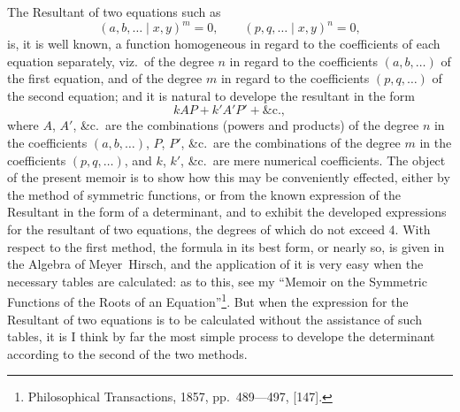 \documentclass[11pt,a4paper]{article}
\begin{document}
\normalsize

The Resultant of two equations such as
\[
(a, b, \ldots \mid x, y)^m = 0,
\qquad
(p, q, \ldots \mid x, y)^n = 0,
\]
is, it is well known, a function homogeneous in regard to the coefficients of
each equation separately, viz.\ of the degree $n$ in regard to the
coefficients $(a, b, \ldots)$ of the first equation, and of the degree $m$
in regard to the coefficients $(p, q, \ldots)$ of the second equation; and it
is natural to develope the resultant in the form
\[
kAP + k'A'P' + \&\text{c.},
\]
where $A$, $A'$, \&c.\ are the combinations (powers and products) of the
degree $n$ in the coefficients $(a, b, \ldots)$, $P$, $P'$, \&c.\ are the
combinations of the degree $m$ in the coefficients $(p, q, \ldots)$, and $k$,
$k'$, \&c.\ are mere numerical coefficients. The object of the present memoir
is to show how this may be conveniently effected, either by the method of
symmetric functions, or from the known expression of the Resultant in the form
of a determinant, and to exhibit the developed expressions for the resultant of
two equations, the degrees of which do not exceed 4. With respect to the first
method, the formula in its best form, or nearly so, is given in the Algebra of
Meyer~Hirsch, and the application of it is very easy when the necessary tables
are calculated: as to this, see my ``Memoir on the Symmetric Functions of the
Roots of an Equation''\footnote{Philosophical Transactions, 1857,
pp.~489---497, [147].}. But when the expression for the Resultant of two
equations is to be calculated without the assistance of such tables, it is I
think by far the most simple process to develope the determinant according to
the second of the two methods.
\end{document}
